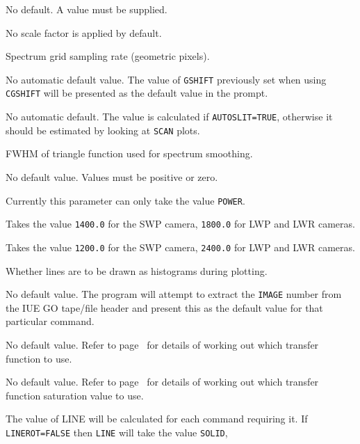 \begin {description}
   No default.  A value must be supplied.
\item [\htmlref{FSCALE}{FSCALE} = 1] \lmbox
   No scale factor is applied by default.
\item [\htmlref{GSAMP}{GSAMP} = 1.414] \lmbox
   Spectrum grid sampling rate (geometric pixels).
\item [\htmlref{GSHIFT}{GSHIFT}] \lmbox
   No automatic default value.  The value of \verb+GSHIFT+ previously set when
   using \verb+CGSHIFT+ will be presented as the default value in the prompt.
\item [\htmlref{GSLIT}{GSLIT}] \lmbox
   No automatic default.  The value is calculated if \verb+AUTOSLIT=TRUE+,
   otherwise it should be estimated by looking at \verb+SCAN+ plots.
\item [\htmlref{HALAV}{HALAV} = 30.0] \lmbox
   FWHM of triangle function used for spectrum smoothing.
\item [\htmlref{HALC}{HALC}] \lmbox
   No default value.  Values must be positive or zero.
\item [\htmlref{HALTYPE}{HALTYPE} = POWER] \lmbox
   Currently this parameter can only take the value \verb+POWER+\@.
\item [\htmlref{HALW0}{HALW0} = 1400.0 or 1800.0] \lmbox
   Takes the value \verb+1400.0+ for the SWP camera, \verb+1800.0+ for
   LWP and LWR cameras.
\item [\htmlref{HALWC}{HALWC} = 1200.0 or 2400.0] \lmbox
   Takes the value \verb+1200.0+ for the SWP camera, \verb+2400.0+ for
   LWP and LWR cameras.
\item [\htmlref{HIST}{HIST} = TRUE] \lmbox
   Whether lines are to be drawn as histograms during plotting.
\item [\htmlref{IMAGE}{IMAGE}] \lmbox
   No default value.  The program will attempt to extract the \verb+IMAGE+
   number from the IUE GO tape/file header and present this as the default
   value for that particular command.
\item [\htmlref{ITF}{ITF}] \lmbox
   No default value.  Refer to page~\pageref{ITF} for details of
   working out which transfer function to use.
\item [\htmlref{ITFMAX}{ITFMAX}] \lmbox
   No default value.  Refer to page~\pageref{ITFMAX} for details of
   working out which transfer function saturation value to use.
\item [\htmlref{LINE}{LINE} (=SOLID)] \lmbox
   The value of LINE will be calculated for each command requiring it.
   If \verb+LINEROT=FALSE+ then \verb+LINE+ will take the value \verb+SOLID+,

\end{description}

